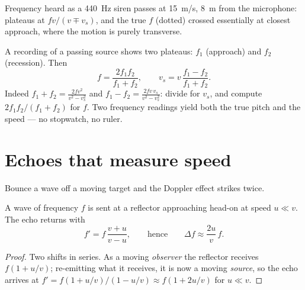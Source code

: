 \begin{omfigure}

{\small Frequency heard as a \qty{440}{Hz} siren passes at \qty{15}{m/s}, \qty{8}{m}
from the microphone: plateaus at $fv/(v \mp v_s)$, and the true $f$ (dotted) crossed
essentially at closest approach, where the motion is purely transverse.}
\end{omfigure}

\begin{method}\label{met:g12:doppler-effect:pass}
A recording of a passing source shows two plateaus: $f_1$ (approach) and $f_2$
(recession). Then
\[
f = \frac{2 f_1 f_2}{f_1 + f_2}, \qquad
v_s = v\,\frac{f_1 - f_2}{f_1 + f_2}.
\]
Indeed $f_1 + f_2 = \frac{2fv^2}{v^2 - v_s^2}$ and $f_1 - f_2 = \frac{2fv\,v_s}{v^2 - v_s^2}$:
divide for $v_s$, and compute $2f_1 f_2/(f_1 + f_2)$ for $f$. Two frequency readings yield
both the true pitch and the speed --- no stopwatch, no ruler.
\end{method}

\section{Echoes that measure speed}

Bounce a wave off a moving target and the Doppler effect strikes twice.

\begin{proposition}\label{prop:g12:doppler-effect:double}
A wave of frequency $f$ is sent at a reflector approaching head-on at speed $u \ll v$.
The echo returns with
\[ f' = f\,\frac{v + u}{v - u}, \qquad \text{hence} \qquad \Delta f \approx \frac{2u}{v}\,f . \]
\end{proposition}

\begin{proof}
Two shifts in series. As a moving \emph{observer} the reflector receives $f(1 + u/v)$;
re-emitting what it receives, it is now a moving \emph{source}, so the echo arrives at
$f' = f(1 + u/v)/(1 - u/v) \approx f(1 + 2u/v)$ for $u \ll v$.
\end{proof}

